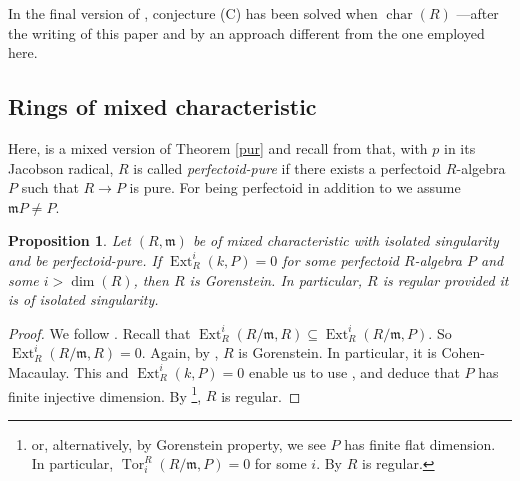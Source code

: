 \documentclass[12pt,reqno]{amsart}
\newtheorem{theorem}{Theorem}[section]
\newtheorem{proposition}[theorem]{Proposition}
\theoremstyle{definition}
\theoremstyle{remark}
\theoremstyle{cited}
\theoremstyle{remark}
\theoremstyle{citeddef}
\DeclareMathOperator{\Ext}{Ext}
\DeclareMathOperator{\Tor}{Tor}
\newcommand{\Cl}{\operatorname{Cl}}
\newcommand{\fm}{\mathfrak{m}}
\begin{document}
	In the final version of  \cite{Asg26}, conjecture (C) has been solved when $\operatorname{char}(R)$ —after the writing of this paper and by an approach different from the one employed here.
	
	

	\subsection{Rings of mixed characteristic}
	Here, is a mixed version of {Theorem} \ref{pur}  and recall from  \cite[Definition 4.1]{ket} that, 
	with $p$ in its Jacobson radical, $R$ is called
	\textit{perfectoid-pure}  if there exists a perfectoid $R$-algebra $P$ such that $R\to P$ is pure. For being perfectoid in addition to \cite{ket} we assume $\fm P\neq P$.
	\begin{proposition}\label{m515}
		Let \((R,\fm)\) be of mixed characteristic  with isolated singularity and be  perfectoid-pure. If 
		\(
		\operatorname{Ext}_R^i(k, P) = 0
		\)
		for some perfectoid $R$-algebra $P$ and some \(i > \dim(R)\), then $R$ is Gorenstein.
		In particular,  \(R\) is regular
		provided it is of isolated singularity.
	\end{proposition}
	
	\begin{proof}We follow \cite[5.15]{Elham}.
		Recall that 
		\(\operatorname{Ext}_R^i(R/\mathfrak{m}, R) \subseteq \operatorname{Ext}_R^i(R/\mathfrak{m}, P)\).
		So \(\operatorname{Ext}_R^i(R/\mathfrak{m}, R) = 0\).
		Again, by \cite{Ro2},  \(R\) is Gorenstein. In particular, it is Cohen-Macaulay.    This and \(\Ext_R^i(k,P)=0\) enable us to use \cite[page 226]{sc3}, and deduce that \(P\) has finite injective dimension. By \cite[Theorem 3.15]{Ryo}\footnote{or, alternatively,
			by Gorenstein property, we see \(P\) has finite flat dimension. In particular,  \(\operatorname{Tor}_i^R(R/\mathfrak{m}, P) = 0\) for some $i$. By \cite[4.4]{bhatt2019Regular} \(R\) is regular.}, \(R\) is regular.
	\end{proof}
	
\end{document}

